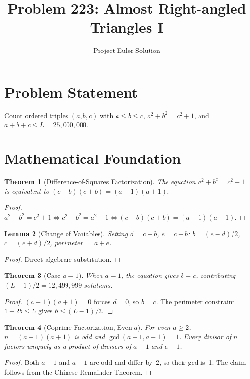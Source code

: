\documentclass[12pt]{article}
\title{Problem 223: Almost Right-angled Triangles I}
\author{Project Euler Solution}
\date{}
\newtheorem{theorem}{Theorem}
\newtheorem{lemma}[theorem]{Lemma}
\begin{document}
\maketitle

\section{Problem Statement}
Count ordered triples $(a, b, c)$ with $a \leq b \leq c$, $a^2 + b^2 = c^2 + 1$, and $a + b + c \leq L = 25{,}000{,}000$.

\section{Mathematical Foundation}

\begin{theorem}[Difference-of-Squares Factorization]
The equation $a^2 + b^2 = c^2 + 1$ is equivalent to $(c-b)(c+b) = (a-1)(a+1)$.
\end{theorem}
\begin{proof}
$a^2 + b^2 = c^2 + 1 \iff c^2 - b^2 = a^2 - 1 \iff (c-b)(c+b) = (a-1)(a+1)$.
\end{proof}

\begin{lemma}[Change of Variables]
Setting $d = c - b$, $e = c + b$: $b = (e-d)/2$, $c = (e+d)/2$, perimeter $= a + e$.
\end{lemma}
\begin{proof}
Direct algebraic substitution.
\end{proof}

\begin{theorem}[Case $a = 1$]
When $a = 1$, the equation gives $b = c$, contributing $(L-1)/2 = 12{,}499{,}999$ solutions.
\end{theorem}
\begin{proof}
$(a-1)(a+1) = 0$ forces $d = 0$, so $b = c$. The perimeter constraint $1 + 2b \leq L$ gives $b \leq (L-1)/2$.
\end{proof}

\begin{theorem}[Coprime Factorization, Even $a$]
For even $a \geq 2$, $n = (a-1)(a+1)$ is odd and $\gcd(a-1, a+1) = 1$. Every divisor of $n$ factors uniquely as a product of divisors of $a-1$ and $a+1$.
\end{theorem}
\begin{proof}
Both $a-1$ and $a+1$ are odd and differ by~2, so their gcd is~1. The claim follows from the Chinese Remainder Theorem.
\end{proof}
\end{document}
